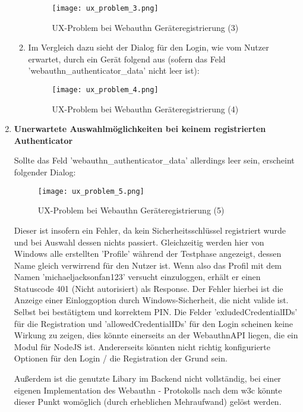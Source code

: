 \begin{enumerate}
\begin{enumerate}
\begin{figure}[ht]
	\centering
	\texttt{[image: ux\_problem\_3.png]}
	\caption[UX-Problem bei Webauthn Geräteregistrierung (3)]{UX-Problem bei Webauthn Geräteregistrierung (3)}
	\label{fig:ux_problem_3}
\end{figure}

\item Im Vergleich dazu sieht der Dialog für den Login, wie vom Nutzer erwartet, durch ein Gerät folgend aus (sofern das Feld 'webauthn\_authenticator\_data' nicht leer ist):

\begin{figure}[ht]
	\centering
	\texttt{[image: ux\_problem\_4.png]}
	\caption[UX-Problem bei Webauthn Geräteregistrierung (4)]{UX-Problem bei Webauthn Geräteregistrierung (4)}
	\label{fig:ux_problem_4}
\end{figure}
\end{enumerate}
\newpage

\item \textbf{Unerwartete Auswahlmöglichkeiten bei keinem registrierten Authenticator}

Sollte das Feld 'webauthn\_authenticator\_data' allerdings leer sein, erscheint folgender Dialog:

\begin{figure}[ht]
	\centering
	\texttt{[image: ux\_problem\_5.png]}
	\caption[UX-Problem bei Webauthn Geräteregistrierung (5)]{UX-Problem bei Webauthn Geräteregistrierung (5)}
	\label{fig:ux_problem_5}
\end{figure}

Dieser ist insofern ein Fehler, da kein Sicherheitsschlüssel registriert wurde und bei Auswahl dessen nichts passiert. Gleichzeitig werden hier von Windows alle erstellten 'Profile' während der Testphase angezeigt, dessen Name gleich verwirrend für den Nutzer ist. Wenn also das Profil mit dem Namen 'michaeljacksonfan123' versucht einzuloggen, erhält er einen Statuscode 401 (Nicht autorisiert) als Response. Der Fehler hierbei ist die Anzeige einer Einloggoption durch Windows-Sicherheit, die nicht valide ist. Selbst bei bestätigtem und korrektem PIN. Die Felder 'exludedCredentialIDs' für die Registration und 'allowedCredentialIDs' für den Login scheinen keine Wirkung zu zeigen, dies könnte einerseits an der WebauthnAPI liegen, die ein Modul für NodeJS ist. Andererseits könnten nicht richtig konfigurierte Optionen für den Login / die Registration der Grund sein.
\newpage

Außerdem ist die genutzte Libary im Backend nicht vollständig, bei einer eigenen Implementation des Webauthn - Protokolls nach dem \ac{w3c} könnte dieser Punkt womöglich (durch erheblichen Mehraufwand) gelöst werden.


\end{enumerate}
